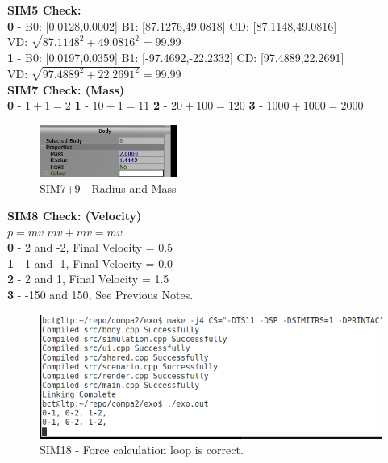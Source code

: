 \textbf{SIM5 Check:} \\
\textbf{0} - B0: [0.0128,0.0002] \hspace{20pt} B1: [87.1276,49.0818] \hspace{20pt} CD: [87.1148,49.0816] \\
    VD: $\sqrt{87.1148^2 + 49.0816^2} = 99.99$ \\

\textbf{1} - B0: [0.0197,0.0359] \hspace{20pt} B1: [-97.4692,-22.2332] \hspace{20pt} CD: [97.4889,22.2691] \\
    VD: $\sqrt{97.4889^2 + 22.2691^2} = 99.99$ \\
    
\textbf{SIM7 Check: (Mass)} \\
\textbf{0} - $1 + 1 = 2$ \hspace{10pt} \textbf{1} - $10 + 1 = 11$ \hspace{10pt} \textbf{2} - $20 + 100 = 120$ \hspace{10pt} \textbf{3} - $1000 + 1000 = 2000$ \\


\begin{figure}
  \centering
  \includegraphics[width=0.4\textwidth]{img/testingEvidence/sim9.png}
  \caption{SIM7+9 - Radius and Mass}
\end{figure}

\textbf{SIM8 Check: (Velocity)} \\
$p=mv$ \hspace{20pt} $mv+mv=mv$ \\
\textbf{0} - 2 and -2, Final Velocity = 0.5 \\
\textbf{1} - 1 and -1, Final Velocity = 0.0 \\
\textbf{2} - 2 and  1, Final Velocity = 1.5 \\
\textbf{3} - -150 and 150, See Previous Notes. \\

\pagebreak

\begin{figure}[H]
  \centering
  \includegraphics[width=\textwidth]{img/testingEvidence/sim18.png}
  \caption{SIM18 - Force calculation loop is correct.}
\end{figure}

